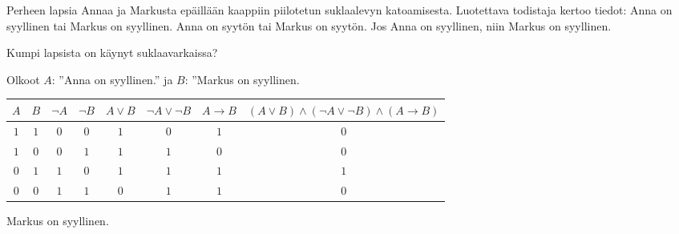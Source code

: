 \begin{tehtava}
    Perheen lapsia Annaa ja Markusta epäillään kaappiin piilotetun suklaalevyn katoamisesta. Luotettava todistaja kertoo tiedot:
Anna on syyllinen tai Markus on syyllinen.
Anna on syytön tai Markus on syytön. 
Jos Anna on syyllinen, niin Markus on syyllinen.

Kumpi lapsista on käynyt suklaavarkaissa?
    \begin{vastaus} \newline
        Olkoot $A$: ''Anna on syyllinen.'' ja $B$: ''Markus on syyllinen.
        \begin{center}
		    \begin{tabular}{|c|c|c|c|c|c|c|c|}\hline
		    $A$ & $B$ & $\lnot A$ & $\lnot B$ & $A\lor B$ & $\lnot A\lor \lnot B$ & $A\to B$ & $(A\lor B)\land(\lnot A\lor \lnot B)\land(A\to B)$ \\ \hline
		    $1$ & $1$ & $0$ & $0$ & $1$ & $0$ & $1$ & $0$ \\ %
		    $1$ & $0$ & $0$ & $1$ & $1$ & $1$ & $0$ & $0$ \\
		    $0$ & $1$ & $1$ & $0$ & $1$ & $1$ & $1$ & $1$ \\
		    $0$ & $0$ & $1$ & $1$ & $0$ & $1$ & $1$ & $0$ \\ \hline
\end{tabular}
\end{center}
    Markus on syyllinen.
    \end{vastaus}
    
\end{tehtava}

